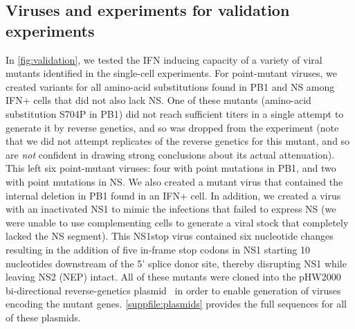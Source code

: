 \documentclass[10pt,letterpaper]{article}
\newcommand{\FIG}[1]{\autoref{fig:#1}}
\newcommand{\SUPPFILE}[1]{\autoref{suppfile:#1}}
\begin{document}
\subsection*{Viruses and experiments for validation experiments}
In \FIG{validation}, we tested the IFN inducing capacity of a variety of viral mutants identified in the single-cell experiments.
For point-mutant viruses, we created variants for all amino-acid substitutions found in PB1 and NS among IFN+ cells that did not also lack NS.
One of these mutants (amino-acid substitution S704P in PB1) did not reach sufficient titers in a single attempt to generate it by reverse genetics, and so was dropped from the experiment (note that we did not attempt replicates of the reverse genetics for this mutant, and so are \emph{not} confident in drawing strong conclusions about its actual attenuation).
This left six point-mutant viruses: four with point mutations in PB1, and two with point mutations in NS.
We also created a mutant virus that contained the internal deletion in PB1 found in an IFN+ cell.
In addition, we created a virus with an inactivated NS1 to mimic the infections that failed to express NS (we were unable to use complementing cells to generate a viral stock that completely lacked the NS segment).
This NS1stop virus contained six nucleotide changes resulting in the addition of five in-frame stop codons in NS1 starting 10 nucleotides downstream of the 5' splice donor site, thereby disrupting NS1 while leaving NS2 (NEP) intact.
All of these mutants were cloned into the pHW2000 bi-directional reverse-genetics plasmid~\citep{hoffmann2000dna} in order to enable generation of viruses encoding the mutant genes.
 \SUPPFILE{plasmids} provides the full sequences for all of these plasmids.
\end{document}
